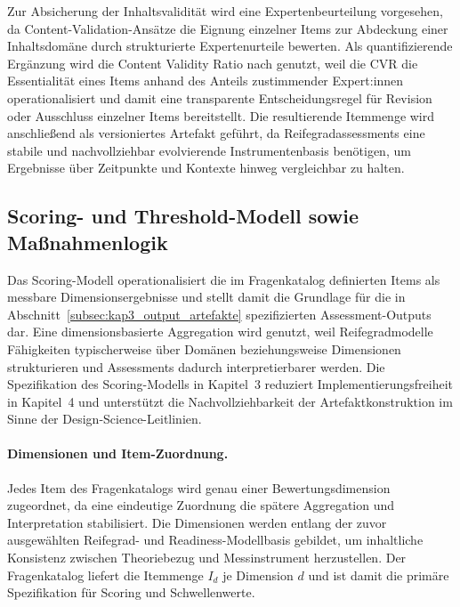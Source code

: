 Zur Absicherung der Inhaltsvalidität wird eine Expertenbeurteilung vorgesehen, da Content-Validation-Ansätze die Eignung einzelner Items zur Abdeckung einer Inhaltsdomäne durch strukturierte Expertenurteile bewerten.\cite{Lawshe1975ContentValidity,AyreScally2014CVR,Boateng2018ScaleDevelopment}
Als quantifizierende Ergänzung wird die Content Validity Ratio nach \citeauthor{Lawshe1975ContentValidity} genutzt, weil die CVR die Essentialität eines Items anhand des Anteils zustimmender Expert:innen operationalisiert und damit eine transparente Entscheidungsregel für Revision oder Ausschluss einzelner Items bereitstellt.\cite{Lawshe1975ContentValidity,AyreScally2014CVR}
Die resultierende Itemmenge wird anschließend als versioniertes Artefakt geführt, da Reifegradassessments eine stabile und nachvollziehbar evolvierende Instrumentenbasis benötigen, um Ergebnisse über Zeitpunkte und Kontexte hinweg vergleichbar zu halten.\cite{Stoiber2023KeepingMaturityAlive,deBruin2005MainPhases}



\subsection{Scoring- und Threshold-Modell sowie Maßnahmenlogik}
\label{subsec:kap3_scoring_threshold_massnahmen}

Das Scoring-Modell operationalisiert die im Fragenkatalog definierten Items als messbare Dimensionsergebnisse und stellt damit die Grundlage für die in Abschnitt~\ref{subsec:kap3_output_artefakte} spezifizierten Assessment-Outputs dar.\cite{deBruin2005MainPhases,BeckerKnackstedtPoeppelbuss2009ProcedureModel}
Eine dimensionsbasierte Aggregation wird genutzt, weil Reifegradmodelle Fähigkeiten typischerweise über Domänen beziehungsweise Dimensionen strukturieren und Assessments dadurch interpretierbarer werden.\cite{deBruin2005MainPhases,PoeppeelbussRoeglinger2011DesignPrinciples}
Die Spezifikation des Scoring-Modells in Kapitel~3 reduziert Implementierungsfreiheit in Kapitel~4 und unterstützt die Nachvollziehbarkeit der Artefaktkonstruktion im Sinne der Design-Science-Leitlinien.\cite{Hevner2004DesignScience,MarchSmith1995DesignNaturalScience}

\paragraph{Dimensionen und Item-Zuordnung.}
Jedes Item des Fragenkatalogs wird genau einer Bewertungsdimension zugeordnet, da eine eindeutige Zuordnung die spätere Aggregation und Interpretation stabilisiert.\cite{deBruin2005MainPhases,BeckerKnackstedtPoeppelbuss2009ProcedureModel}
Die Dimensionen werden entlang der zuvor ausgewählten Reifegrad- und Readiness-Modellbasis gebildet, um inhaltliche Konsistenz zwischen Theoriebezug und Messinstrument herzustellen.\cite{PoeppeelbussRoeglinger2011DesignPrinciples,TornatzkyFleischer1990TOE,OliveiraMartins2011ITAdoptionReview}
Der Fragenkatalog liefert die Itemmenge $I_d$ je Dimension $d$ und ist damit die primäre Spezifikation für Scoring und Schwellenwerte.\cite{deBruin2005MainPhases,BeckerKnackstedtPoeppelbuss2009ProcedureModel}

